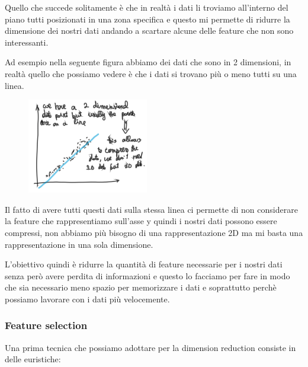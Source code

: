 \documentclass[14pt]{extreport}
\begin{document}
Quello che succede solitamente è che in realtà i dati li troviamo all'interno del piano tutti posizionati in una zona specifica
e questo mi permette di ridurre la dimensione dei nostri dati andando a scartare alcune delle feature che non sono interessanti.

Ad esempio nella seguente figura abbiamo dei dati che sono in 2 dimensioni, in realtà quello che possiamo vedere è che i dati
si trovano più o meno tutti su una linea.

\begin{figure}[H]
\centering
\includegraphics[width=0.4\linewidth]{435.jpeg}
\end{figure}

Il fatto di avere tutti questi dati sulla stessa linea ci permette di non considerare la feature che rappresentiamo sull'asse y
quindi i nostri dati possono essere compressi, non abbiamo più bisogno di una rappresentazione 2D ma mi basta una rappresentazione in una
sola dimensione.

L'obiettivo quindi è ridurre la quantità di feature necessarie per i nostri dati senza però avere perdita di informazioni e questo
lo facciamo per fare in modo che sia necessario meno spazio per memorizzare i dati e soprattutto perchè possiamo lavorare con i dati 
più velocemente.


\subsubsection{Feature selection}

Una prima tecnica che possiamo adottare per la dimension reduction consiste in delle euristiche:
\end{document}
